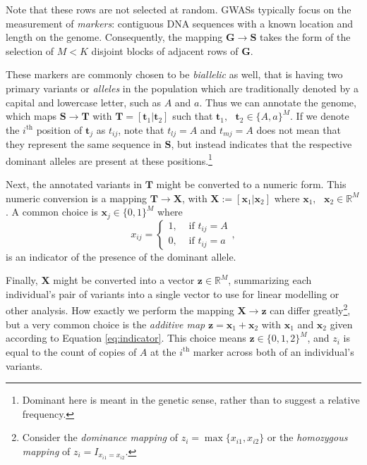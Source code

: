\documentclass{article}
\newcommand{\ve}[1]{\mathbf{#1}}           %
\newcommand{\m}[1]{\mathbf{#1}}               %
\newcommand{\field}[1]{\mathbb{#1}}
\newcommand{\Reals}{\field{R}}
\begin{document}
Note that these rows are not selected at random. GWASs typically focus on the measurement of \textit{markers}: contiguous DNA sequences with a known location and length on the genome. Consequently, the mapping $\m{G} \rightarrow \m{S}$ takes the form of the selection of $M < K$ disjoint blocks of adjacent rows of $\m{G}$. 

These markers are commonly chosen to be \textit{biallelic} as well, that is having two primary variants or \textit{alleles} in the population which are traditionally denoted by a capital and lowercase letter, such as $A$ and $a$. Thus we can annotate the genome, which maps $\m{S} \rightarrow \m{T}$ with $\m{T} = [\ve{t}_1 | \ve{t}_2]$ such that $\ve{t}_1, \text{ } \ve{t}_2 \in \{A,a\}^M$. If we denote the $i^{\text{th}}$ position of $\ve{t}_j$ as $t_{ij}$, note that $t_{lj} = A$ and $t_{mj} = A$ does not mean that they represent the same sequence in $\m{S}$, but instead indicates that the respective dominant alleles are present at these positions.\footnote{Dominant here is meant in the genetic sense, rather than to suggest a relative frequency.}

Next, the annotated variants in $\m{T}$ might be converted to a numeric form. This numeric conversion is a mapping $\m{T} \rightarrow \m{X}$, with $\m{X} := [\ve{x}_1 | \ve{x}_2]$ where $\ve{x}_1, \text{ } \ve{x}_2 \in \Reals^M$. A common choice is $\ve{x}_j \in \{0,1\}^M$ where
\begin{equation} \label{eq:indicator}
x_{ij} = \begin{cases}
  1, & \text{ if } t_{ij} = A \\
  0, & \text{ if } t_{ij} = a
\end{cases},
\end{equation}
is an indicator of the presence of the dominant allele.

Finally, $\m{X}$ might be converted into a vector $\ve{z} \in \Reals^M$, summarizing each individual's pair of variants into a single vector to use for linear modelling or other analysis. How exactly we perform the mapping $\m{X} \rightarrow \ve{z}$ can differ greatly\footnote{Consider the \textit{dominance mapping} of $z_i = \max\{x_{i1}, x_{i2}\}$ or the \textit{homozygous mapping} of $z_i = I_{x_{i1} = x_{i2}}$.}, but a very common choice is the \textit{additive map} $\ve{z} = \ve{x}_1 + \ve{x}_2$ with $\ve{x}_1$ and $\ve{x}_2$ given according to Equation \ref{eq:indicator}. This choice means $\ve{z} \in \{0,1,2\}^M$, and $z_i$ is equal to the count of copies of $A$ at the $i^{\text{th}}$ marker across both of an individual's variants.
\end{document}
